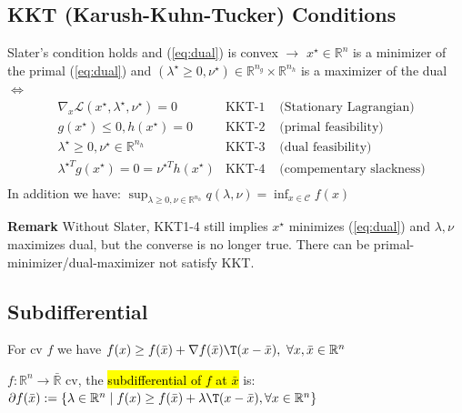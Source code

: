 \subsection{KKT (Karush-Kuhn-Tucker) Conditions}

\begin{theorem}
	Slater's condition holds
	and (\ref{eq:dual}) is convex
	$\rightarrow$
	$x^\star \in \mathbb{R}^{n}$ is a minimizer of the primal (\ref{eq:dual})
	and $(\lambda^\star \ge 0,\nu^\star) \in \mathbb{R}^{n_g}\times\mathbb{R}^{n_h}$ is a maximizer of the dual
	$\Leftrightarrow$
	$$\begin{aligned}
			 & \nabla_x\mathcal{L}(x^\star,\lambda^\star,\nu^\star)=0
			 & \text{KKT-1 }
			 & \text{(Stationary Lagrangian)}
			\\
			 & g(x^\star)\le0, h(x^\star)=0
			 & \text{KKT-2 }
			 & \text{(primal feasibility)}
			\\
			 & \lambda^\star\ge0, \nu^\star \in \mathbb{R}^{n_h}
			 & \text{KKT-3 }
			 & \text{(dual feasibility)}
			\\
			 & \lambda^{\star T} g(x^\star)=0=\nu^{\star T} h(x^\star)
			 &
			\text{KKT-4 }
			 & \text{(compementary slackness)}
			\\
		\end{aligned}$$
	In addition we have:
	$\sup_{\lambda\ge0,\nu\in\mathbb{R}^{n_h}}q(\lambda,\nu)=\inf_{x\in\mathcal{C}}f(x)$
\end{theorem}

\textbf{Remark} Without Slater,
KKT1-4 still implies $x^\star$ minimizes (\ref{eq:dual})
and $\lambda,\nu$ maximizes dual,
but the converse is no longer true.
There can be primal-minimizer/dual-maximizer not satisfy KKT.

\subsection{Subdifferential}

For cv $f$ we have
$f(x)\ge f(\bar{x})+\nabla f(\bar{x})\T(x-\bar{x}),\ \forall x,\bar{x}\in \mathbb{R}^{n}$

\begin{definition}
	$f: \mathbb{R}^{n} \rightarrow \bar{\mathbb{R}}$ cv,
	the \textcolor{hltext}{\hl{ subdifferential of $f$ at $\bar{x}$ }}is:
	$\partial f(\bar{x}):=
		\{\lambda \in \mathbb{R}^{n} \mid
		f(x)\ge f(\bar{x})+\lambda\T(x-\bar{x}),
		\forall x \in \mathbb{R}^{n}
		\}$
	\label{def:subdifferential}
\end{definition}

